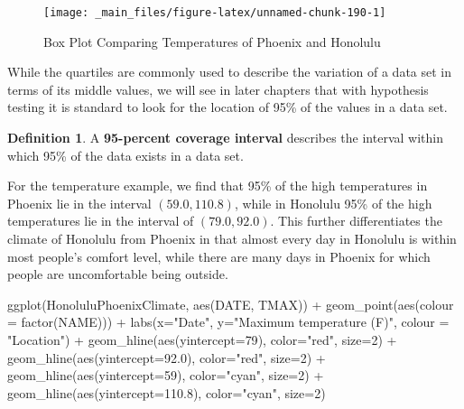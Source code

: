 \documentclass[
]{book}
\newenvironment{Shaded}{\begin{snugshade}}{\end{snugshade}}
\newcommand{\AttributeTok}[1]{\textcolor[rgb]{0.77,0.63,0.00}{#1}}
\newcommand{\DecValTok}[1]{\textcolor[rgb]{0.00,0.00,0.81}{#1}}
\newcommand{\FloatTok}[1]{\textcolor[rgb]{0.00,0.00,0.81}{#1}}
\newcommand{\FunctionTok}[1]{\textcolor[rgb]{0.00,0.00,0.00}{#1}}
\newcommand{\NormalTok}[1]{#1}
\newcommand{\SpecialCharTok}[1]{\textcolor[rgb]{0.00,0.00,0.00}{#1}}
\newcommand{\StringTok}[1]{\textcolor[rgb]{0.31,0.60,0.02}{#1}}
\theoremstyle{definition}
\newtheorem{definition}{Definition}[chapter]
\theoremstyle{definition}
\theoremstyle{definition}
\theoremstyle{definition}
\theoremstyle{remark}
\begin{document}
\begin{figure}

{\centering \texttt{[image: \_main\_files/figure-latex/unnamed-chunk-190-1]} 

}

\caption{Box Plot Comparing Temperatures of Phoenix and Honolulu}\label{fig:unnamed-chunk-190}
\end{figure}

While the quartiles are commonly used to describe the variation of a data set in terms of its middle values, we will see in later chapters that with hypothesis testing it is standard to look for the location of 95\% of the values in a data set.

\begin{definition}
A \textbf{95-percent coverage interval} describes the interval within which 95\% of the data exists in a data set.
\end{definition}

For the temperature example, we find that 95\% of the high temperatures in Phoenix lie in the interval \((59.0, 110.8)\), while in Honolulu 95\% of the high temperatures lie in the interval of \((79.0,92.0)\). This further differentiates the climate of Honolulu from Phoenix in that almost every day in Honolulu is within most people's comfort level, while there are many days in Phoenix for which people are uncomfortable being outside.

\begin{Shaded}
\begin{Highlighting}[]
\FunctionTok{ggplot}\NormalTok{(HonoluluPhoenixClimate, }\FunctionTok{aes}\NormalTok{(DATE, TMAX)) }\SpecialCharTok{+} \FunctionTok{geom\_point}\NormalTok{(}\FunctionTok{aes}\NormalTok{(}\AttributeTok{colour =} \FunctionTok{factor}\NormalTok{(NAME))) }\SpecialCharTok{+} \FunctionTok{labs}\NormalTok{(}\AttributeTok{x=}\StringTok{"Date"}\NormalTok{, }\AttributeTok{y=}\StringTok{"Maximum temperature (F)"}\NormalTok{, }\AttributeTok{colour =} \StringTok{"Location"}\NormalTok{) }\SpecialCharTok{+} \FunctionTok{geom\_hline}\NormalTok{(}\FunctionTok{aes}\NormalTok{(}\AttributeTok{yintercept=}\DecValTok{79}\NormalTok{), }\AttributeTok{color=}\StringTok{"red"}\NormalTok{, }\AttributeTok{size=}\DecValTok{2}\NormalTok{) }\SpecialCharTok{+} \FunctionTok{geom\_hline}\NormalTok{(}\FunctionTok{aes}\NormalTok{(}\AttributeTok{yintercept=}\FloatTok{92.0}\NormalTok{), }\AttributeTok{color=}\StringTok{"red"}\NormalTok{, }\AttributeTok{size=}\DecValTok{2}\NormalTok{) }\SpecialCharTok{+} \FunctionTok{geom\_hline}\NormalTok{(}\FunctionTok{aes}\NormalTok{(}\AttributeTok{yintercept=}\DecValTok{59}\NormalTok{), }\AttributeTok{color=}\StringTok{"cyan"}\NormalTok{, }\AttributeTok{size=}\DecValTok{2}\NormalTok{) }\SpecialCharTok{+} \FunctionTok{geom\_hline}\NormalTok{(}\FunctionTok{aes}\NormalTok{(}\AttributeTok{yintercept=}\FloatTok{110.8}\NormalTok{), }\AttributeTok{color=}\StringTok{"cyan"}\NormalTok{, }\AttributeTok{size=}\DecValTok{2}\NormalTok{)}
\end{Highlighting}
\end{Shaded}
\end{document}
